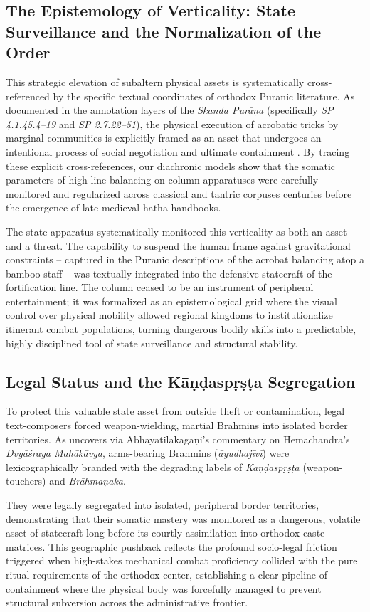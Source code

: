 \documentclass[11pt,twoside,letterpaper]{article}
\begin{document}
\subsection{The Epistemology of Verticality: State Surveillance and the Normalization of the Order}
This strategic elevation of subaltern physical assets is systematically cross-referenced by the specific textual coordinates of orthodox Puranic literature. As documented in the annotation layers of the \textit{Skanda Purāṇa} (specifically \textit{SP 4.1.45.4–19} and \textit{SP 2.7.22–51}), the physical execution of acrobatic tricks by marginal communities is explicitly framed as an asset that undergoes an intentional process of social negotiation and ultimate containment \citep{Shastri1991}. By tracing these explicit cross-references, our diachronic models show that the somatic parameters of high-line balancing on column apparatuses were carefully monitored and regularized across classical and tantric corpuses centuries before the emergence of late-medieval hatha handbooks.

The state apparatus systematically monitored this verticality as both an asset and a threat. The capability to suspend the human frame against gravitational constraints – captured in the Puranic descriptions of the acrobat balancing atop a bamboo staff – was textually integrated into the defensive statecraft of the fortification line. The column ceased to be an instrument of peripheral entertainment; it was formalized as an epistemological grid where the visual control over physical mobility allowed regional kingdoms to institutionalize itinerant combat populations, turning dangerous bodily skills into a predictable, highly disciplined tool of state surveillance and structural stability.

\subsection{Legal Status and the Kāṇḍaspṛṣṭa Segregation}
To protect this valuable state asset from outside theft or contamination, legal text-composers forced weapon-wielding, martial Brahmins into isolated border territories. As \citet{Sandesara1948} uncovers via Abhayatilakagaṇi’s commentary on Hemachandra’s \textit{Dvyāśraya Mahākāvya}, arms-bearing Brahmins (\textit{āyudhajīvī}) were lexicographically branded with the degrading labels of \textit{Kāṇḍaspṛṣṭa} (weapon-touchers) and \textit{Brāhmaṇaka}. 

They were legally segregated into isolated, peripheral border territories, demonstrating that their somatic mastery was monitored as a dangerous, volatile asset of statecraft long before its courtly assimilation into orthodox caste matrices. This geographic pushback reflects the profound socio-legal friction triggered when high-stakes mechanical combat proficiency collided with the pure ritual requirements of the orthodox center, establishing a clear pipeline of containment where the physical body was forcefully managed to prevent structural subversion across the administrative frontier.
\end{document}
